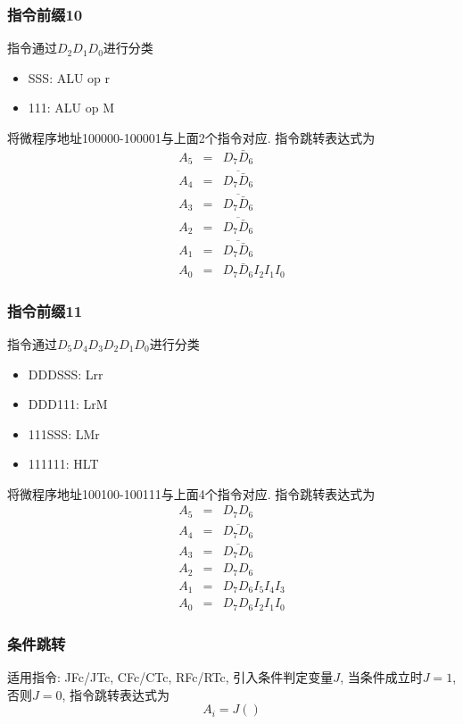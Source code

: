 \documentclass[10pt]{book}
\begin{document}
\subsubsection{指令前缀10}
指令通过$D_{2}D_{1}D_{0}$进行分类
\begin{itemize}
  \item SSS: ALU op r
  \item 111: ALU op M
\end{itemize}

将微程序地址100000-100001与上面2个指令对应. 指令跳转表达式为
\begin{eqnarray}
A_{5} &=& D_{7}\bar D_{6} \\
A_{4} &=& \overline{D_{7}\bar D_{6}} \\
A_{3} &=& \overline{D_{7}\bar D_{6}} \\
A_{2} &=& \overline{D_{7}\bar D_{6}} \\
A_{1} &=& \overline{D_{7}\bar D_{6}} \\
A_{0} &=& D_{7}\bar D_{6}I_{2}I_{1}I_{0}
\end{eqnarray}

\subsubsection{指令前缀11}
指令通过$D_{5}D_{4}D_{3}D_{2}D_{1}D_{0}$进行分类
\begin{itemize}
  \item DDDSSS: Lrr
  \item DDD111: LrM
  \item 111SSS: LMr
  \item 111111: HLT
\end{itemize}

将微程序地址100100-100111与上面4个指令对应. 指令跳转表达式为
\begin{eqnarray}
A_{5} &=& D_{7}D_{6} \\
A_{4} &=& \overline{D_{7}D_{6}} \\
A_{3} &=& \overline{D_{7}D_{6}} \\
A_{2} &=& D_{7}D_{6} \\
A_{1} &=& D_{7}D_{6}I_{5}I_{4}I_{3} \\
A_{0} &=& D_{7}D_{6}I_{2}I_{1}I_{0}
\end{eqnarray}

\subsubsection{条件跳转}
适用指令: JFc/JTc, CFc/CTc, RFc/RTc, 引入条件判定变量$J$, 当条件成立时$J=1$, 否则$J=0$, 指令跳转表达式为
\begin{equation}
A_{i}=J()
\end{equation}
\end{document}

